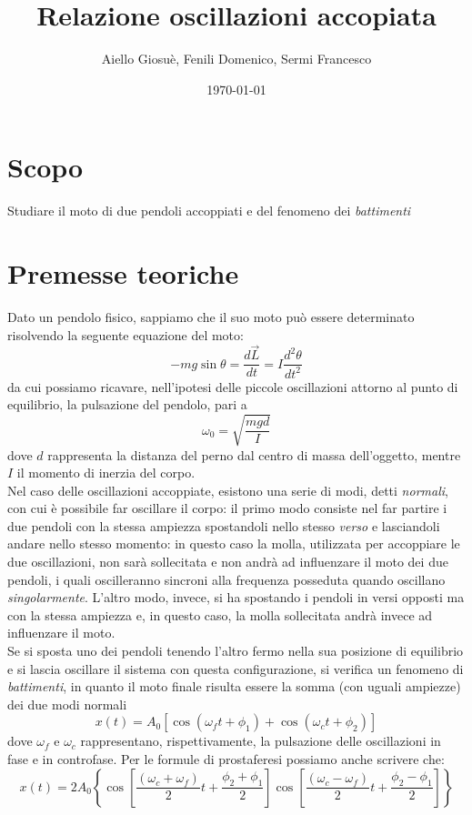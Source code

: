 \documentclass{article}
\title{Relazione oscillazioni accopiata}
\author{Aiello Giosuè, Fenili Domenico, Sermi Francesco}
\date{\today}
\begin{document}
\maketitle
\newpage
\tableofcontents

\newpage
\section{Scopo}
Studiare il moto di due pendoli accoppiati e del fenomeno dei \emph{battimenti}
\section{Premesse teoriche}
Dato un pendolo fisico, sappiamo che il suo moto può essere determinato risolvendo la seguente equazione del moto:
\begin{equation}
	-mg\sin{\theta} = \frac{d\vec{L}}{dt} = I\frac{d^2 \theta}{dt^2}
\end{equation}
da cui possiamo ricavare, nell'ipotesi delle piccole oscillazioni attorno al punto di equilibrio, la pulsazione del pendolo, pari a
\begin{equation}
	\omega_0 = \sqrt{\frac{mgd}{I}}
	\label{pulsazione}
\end{equation}
dove $d$ rappresenta la distanza del perno dal centro di massa dell'oggetto, mentre $I$ il momento di inerzia del corpo. \\
Nel caso delle oscillazioni accoppiate, esistono una serie di modi, detti \emph{normali}, con cui è possibile far oscillare il corpo: il primo modo consiste nel far partire i due pendoli con la stessa ampiezza spostandoli nello stesso \emph{verso} e lasciandoli andare nello stesso momento: in questo caso la molla, utilizzata per accoppiare le due oscillazioni, non sarà sollecitata e non andrà ad influenzare il moto dei due pendoli, i quali oscilleranno sincroni alla frequenza posseduta quando oscillano \emph{singolarmente}. L'altro modo, invece, si ha spostando i pendoli in versi opposti ma con la stessa ampiezza e, in questo caso, la molla sollecitata andrà invece ad influenzare il moto. \\
Se si sposta uno dei pendoli tenendo l'altro fermo nella sua posizione di equilibrio e si lascia oscillare il sistema con questa configurazione, si verifica un fenomeno di \emph{battimenti}, in quanto il moto finale risulta essere la somma (con uguali ampiezze) dei due modi normali
\begin{equation}
	x(t) = A_0 \left[\cos{ \left(\omega_f t + \phi_1 \right) } + \cos{ \left( \omega_c t + \phi_2 \right) } \right]
\end{equation}
dove $\omega_f$ e $\omega_c$ rappresentano, rispettivamente, la pulsazione delle oscillazioni in fase e in controfase. Per le formule di prostaferesi possiamo anche scrivere che:
\begin{equation}
	x(t) = 2A_0 \left\{ \cos{\left[\frac{(\omega_c + \omega_f)}{2} t + \frac{\phi_2 + \phi_1}{2} \right] } \cos{\left[ \frac{(\omega_c - \omega_f)}{2} t + \frac{\phi_2 - \phi_1}{2} \right]} \right\}
\end{equation}
\end{document}
